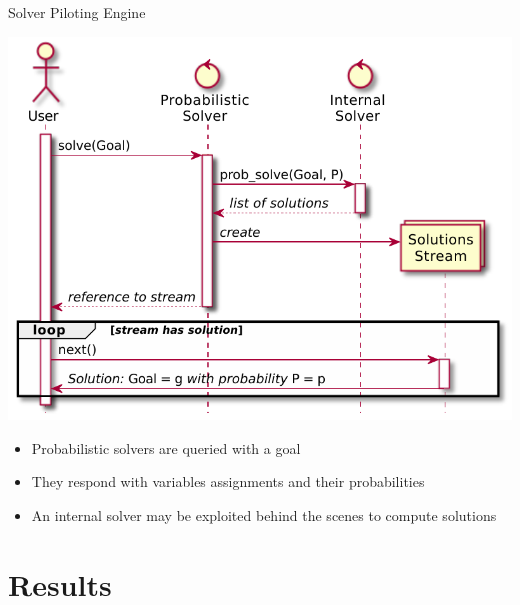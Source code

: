 \documentclass[presentation]{beamer}\mode<presentation>{\usetheme{AMSBolognaFC}}
\begin{document}
\begin{frame}[c]{Solver Piloting Engine}


    \begin{center}
        \includegraphics[width=.5\linewidth]{img/general-api.pdf}
    \end{center}
    \begin{itemize}\small
        \item Probabilistic solvers are queried with a \alert{goal}
        \item They respond with \alert{variables assignments} and their \alert{probabilities}
        \item An \alert{internal solver} may be exploited behind the scenes to compute solutions
    \end{itemize}

\end{frame}

\section{Results}
\end{document}

